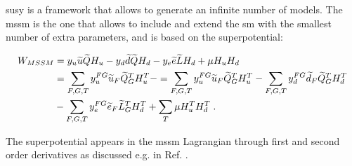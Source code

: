 \gls{susy} is a framework that allows to generate an infinite number of models. The \gls{mssm} is the one that allows to include and extend the \gls{sm} with the smallest number of extra parameters, and is based on the superpotential:

\begin{equation}
\begin{aligned}
W_{MSSM} & = y_u \widetilde{u} \widetilde{Q} H_u - y_d \widetilde{d}\widetilde{Q} H_d - y_e \widetilde{e} \widetilde{L}H_d + \mu H_u H_d \\  
& = \sum_{F, G, T} y_u^{FG} \widetilde{u}_F \widetilde{Q}_G^T H_u^T -
 = \sum_{F, G, T} y_u^{FG} \widetilde{u}_F \widetilde{Q}_G^T H_u^T - 
   \sum_{F, G, T} y_d^{FG} \widetilde{d}_F \widetilde{Q}_G^T H_d^T   \\ 
   & -
   \sum_{F, G, T} y_e^{FG} \widetilde{e}_F\widetilde{L}_G^T H_d^T  +
   \sum_{T} \mu H_u^T H_d^T \;.
\end{aligned}
\label{eq:WMMS}
\end{equation}

\noindent The superpotential appears in the \gls{mssm} Lagrangian through first and second order derivatives as discussed e.g. in Ref. \cite{Martin:1997ns}.

